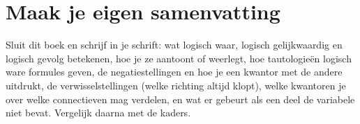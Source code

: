 
\ifzelfstudie
\section*{Maak je eigen samenvatting}
Sluit dit boek en schrijf in je schrift: wat logisch waar, logisch gelijkwaardig en logisch gevolg betekenen, hoe je ze aantoont of weerlegt, hoe tautologieën logisch ware formules geven, de negatiestellingen en hoe je een kwantor met de andere uitdrukt, de verwisselstellingen (welke richting altijd klopt), welke kwantoren je over welke connectieven mag verdelen, en wat er gebeurt als een deel de variabele niet bevat. Vergelijk daarna met de kaders.
\fi
